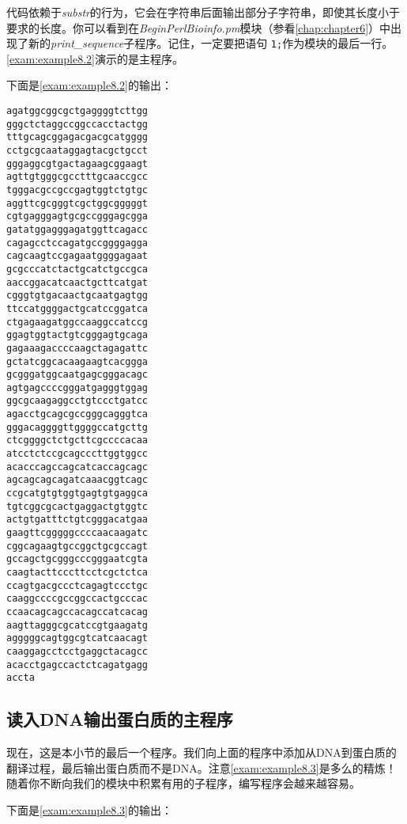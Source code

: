 代码依赖于\textit{substr}的行为，它会在字符串后面输出部分子字符串，即使其长度小于要求的长度。你可以看到在\textit{BeginPerlBioinfo.pm}模块（参看\autoref{chap:chapter6}）中出现了新的\textit{print\_sequence}子程序。记住，一定要把语句 \verb|1;|作为模块的最后一行。\autoref{exam:example8.2}演示的是主程序。



下面是\autoref{exam:example8.2}的输出：

\begin{lstlisting}
agatggcggcgctgaggggtcttgg
gggctctaggccggccacctactgg
tttgcagcggagacgacgcatgggg
cctgcgcaataggagtacgctgcct
gggaggcgtgactagaagcggaagt
agttgtgggcgcctttgcaaccgcc
tgggacgccgccgagtggtctgtgc
aggttcgcgggtcgctggcgggggt
cgtgagggagtgcgccgggagcgga
gatatggagggagatggttcagacc
cagagcctccagatgccggggagga
cagcaagtccgagaatggggagaat
gcgcccatctactgcatctgccgca
aaccggacatcaactgcttcatgat
cgggtgtgacaactgcaatgagtgg
ttccatggggactgcatccggatca
ctgagaagatggccaaggccatccg
ggagtggtactgtcgggagtgcaga
gagaaagaccccaagctagagattc
gctatcggcacaagaagtcacggga
gcgggatggcaatgagcgggacagc
agtgagccccgggatgagggtggag
ggcgcaagaggcctgtccctgatcc
agacctgcagcgccgggcagggtca
gggacaggggttggggccatgcttg
ctcggggctctgcttcgccccacaa
atcctctccgcagcccttggtggcc
acacccagccagcatcaccagcagc
agcagcagcagatcaaacggtcagc
ccgcatgtgtggtgagtgtgaggca
tgtcggcgcactgaggactgtggtc
actgtgatttctgtcgggacatgaa
gaagttcgggggccccaacaagatc
cggcagaagtgccggctgcgccagt
gccagctgcgggcccgggaatcgta
caagtacttcccttcctcgctctca
ccagtgacgccctcagagtccctgc
caaggccccgccggccactgcccac
ccaacagcagccacagccatcacag
aagttagggcgcatccgtgaagatg
agggggcagtggcgtcatcaacagt
caaggagcctcctgaggctacagcc
acacctgagccactctcagatgagg
accta
\end{lstlisting}

\subsection{读入DNA输出蛋白质的主程序}
现在，这是本小节的最后一个程序。我们向上面的程序中添加从DNA到蛋白质的翻译过程，最后输出蛋白质而不是DNA。注意\autoref{exam:example8.3}是多么的精炼！随着你不断向我们的模块中积累有用的子程序，编写程序会越来越容易。



下面是\autoref{exam:example8.3}的输出：

